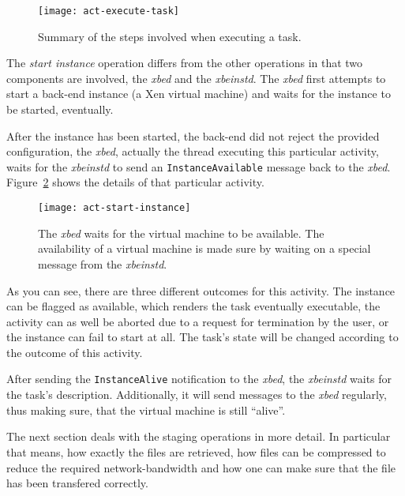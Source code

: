\begin{figure}[ht]
  \centering
  \texttt{[image: act-execute-task]}
  \caption[Summary of executing a task]{Summary of the steps involved when executing a task.}
  \label{fig:act-execute-task}
\end{figure}

The \emph{start  instance} operation differs from the  other operations in
that two components are involved, the \emph{xbed} and the \emph{xbeinstd}.
The \emph{xbed}  first attempts  to start a  back-end instance (\eg  a Xen
virtual machine) and waits for the instance to be started, eventually.

After the instance  has been started, \ie the back-end  did not reject the
provided  configuration, the  \emph{xbed}, actually  the  thread executing
this  particular  activity,  waits  for  the \emph{xbeinstd}  to  send  an
\texttt{Instance\-Available}        message       back        to       the
\emph{xbed}. Figure~\ref{fig:act-start-instance} shows the details of that
particular activity.

\begin{figure}[ht]
  \centering
  \texttt{[image: act-start-instance]}
  \caption[Start Instance Activity]{The  \emph{xbed} waits for the virtual
    machine to  be available.   The availability of  a virtual  machine is
    made sure by waiting on a special message from the \emph{xbeinstd}.}
  \label{fig:act-start-instance}
\end{figure}


As you can see, there are  three different outcomes for this activity. The
instance can  be flagged as  available, which renders the  task eventually
executable,  the activity  can as  well be  aborted due  to a  request for
termination by  the user, or  the instance can  fail to start at  all. The
task's state will be changed according to the outcome of this activity.

After   sending   the   \texttt{Instance\-Alive}   notification   to   the
\emph{xbed},  the  \emph{xbeinstd}   waits  for  the  task's  description.
Additionally,  it will send  messages to  the \emph{xbed}  regularly, thus
making sure, that the virtual machine is still ``alive''.

\bigskip

The  next section deals  with the  staging operations  in more  detail. In
particular that means, how exactly  the files are retrieved, how files can
be compressed  to reduce  the required network-bandwidth  and how  one can
make sure that the file has been transfered correctly.

